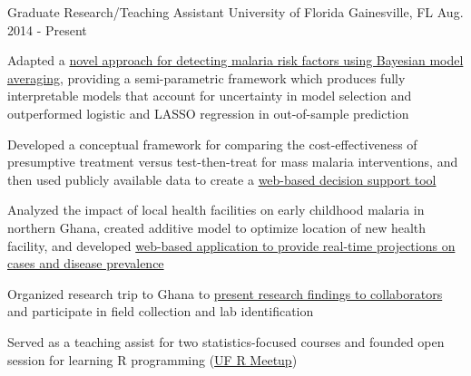 

\begin{cventries}

  \cventry
    {Graduate Research/Teaching Assistant} %
    {University of Florida} %
    {Gainesville, FL} %
    {Aug. 2014 - Present} %
    {
      \begin{cvitems} %
        \item Adapted a \href{https://github.com/justinmillar/bma-malaria}{novel approach for detecting malaria risk factors using Bayesian model averaging}, providing a semi-parametric framework which produces fully interpretable models that account for uncertainty in model selection and outperformed logistic and LASSO regression in out-of-sample prediction
        \item {Developed a conceptual framework for comparing the cost-effectiveness of presumptive treatment versus test-then-treat for mass malaria interventions, and then used publicly available data to create a \href{https://jjmillar.shinyapps.io/msat-example/}{web-based decision support tool}}
        \item {Analyzed the impact of local health facilities on early childhood malaria in northern Ghana, created additive model to optimize location of new health facility, and developed \href{https://jjmillar.shinyapps.io/byd-health-facilities/}{web-based application to provide real-time projections on cases and disease prevalence}}
        \item {Organized research trip to Ghana to \href{https://docs.google.com/presentation/d/1aaZZUpO4PkgKTxZbqvZhFuNVgYWsh6LXcdkYGrNC2Cg/edit?usp=sharing}{present research findings to collaborators} and participate in field collection and lab identification}
        \item {Served as a teaching assist for two statistics-focused courses and founded open session for learning R programming (\href{http://www.r-gators.com/}{UF R Meetup})}
      \end{cvitems}
    }


\end{cventries}
